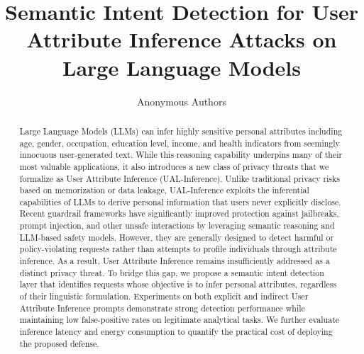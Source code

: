 \documentclass[twocolumn]{article}
\title{Semantic Intent Detection for User Attribute Inference Attacks on Large Language Models}
\author{Anonymous Authors}
\date{}
\begin{document}
\maketitle

\begin{abstract}
Large Language Models (LLMs) can infer highly sensitive personal attributes including age, gender, occupation, education level, income, and health indicators from seemingly innocuous user-generated text. While this reasoning capability underpins many of their most valuable applications, it also introduces a new class of privacy threats that we formalize as User Attribute Inference (UAL-Inference). Unlike traditional privacy risks based on memorization or data leakage, UAL-Inference exploits the inferential capabilities of LLMs to derive personal information that users never explicitly disclose.
Recent guardrail frameworks have significantly improved protection against jailbreaks, prompt injection, and other unsafe interactions by leveraging semantic reasoning and LLM-based safety models. However, they are generally designed to detect harmful or policy-violating requests rather than attempts to profile individuals through attribute inference. As a result, User Attribute Inference remains insufficiently addressed as a distinct privacy threat. To bridge this gap, we propose a semantic intent detection layer that identifies requests whose objective is to infer personal attributes, regardless of their linguistic formulation. 
Experiments on both explicit and indirect User Attribute Inference prompts demonstrate strong detection performance while maintaining low false-positive rates on legitimate analytical tasks. We further evaluate inference latency and energy consumption to quantify the practical cost of deploying the proposed defense.
\end{abstract}












\end{document}
